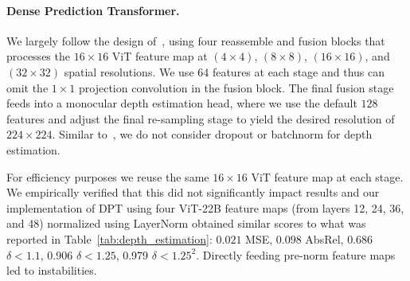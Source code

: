 \paragraph{Dense Prediction Transformer.}

We largely follow the design of~\citep{ranftl2021vision}, using four reassemble and fusion blocks that processes the $16\times16$ ViT feature map at $(4\times4)$, $(8\times8)$, $(16\times16)$, and $(32\times32)$ spatial resolutions.
We use $64$ features at each stage and thus can omit the $1\times1$ projection convolution in the fusion block. 
The final fusion stage feeds into a monocular depth estimation head, where we use the default $128$ features and adjust the final re-sampling stage to yield the desired resolution of $224\times224$.
Similar to~\citep{ranftl2021vision}, we do not consider dropout or batchnorm for depth estimation.

For efficiency purposes we reuse the same $16\times16$ ViT feature map at each stage.
We empirically verified that this did not significantly impact results and our implementation of DPT using four ViT-22B feature maps (from layers 12, 24, 36, and 48) normalized using LayerNorm obtained similar scores to what was reported in Table~\ref{tab:depth_estimation}: $0.021$ MSE, $0.098$ AbsRel, $0.686$ $\delta < 1.1$, 0.906 $\delta < 1.25$, 0.979 $\delta < 1.25^2$.
Directly feeding pre-norm feature maps led to instabilities.


